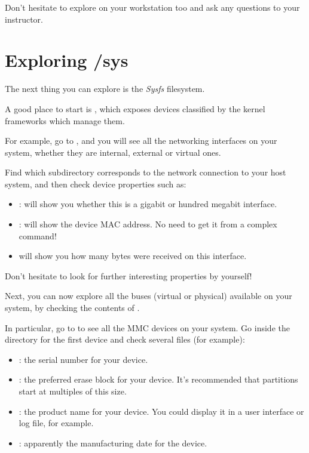 Don't hesitate to explore  on your workstation too
and ask any questions to your instructor.

\section{Exploring /sys}

The next thing you can explore is the {\em Sysfs} filesystem.

A good place to start is , which exposes devices
classified by the kernel frameworks which manage them.

For example, go to , and you will see all the
networking interfaces on your system, whether they are internal,
external or virtual ones.

Find which subdirectory corresponds to the network connection
to your host system, and then check device properties such as:
\begin{itemize}
   \item {}: will show you whether this is a gigabit
         or hundred megabit interface.
   \item {}: will show the device MAC address. No
	 need to get it from a complex command!
   \item {} will show you how many bytes
	 were received on this interface.
\end{itemize}

Don't hesitate to look for further interesting properties by yourself!

Next, you can now explore all the buses (virtual or physical) available
on your system, by checking the contents of .

In particular, go to  to see all the
MMC devices on your system. Go inside the directory for the first device
and check several files (for example):

\begin{itemize}
\item {}: the serial number for your device.
\item {}: the preferred erase block for your
      device. It's recommended that partitions start at multiples of this
      size.
\item {}: the product name for your device. You could display
      it in a user interface or log file, for example.
\item {}: apparently the manufacturing date for the device.
\end{itemize}


